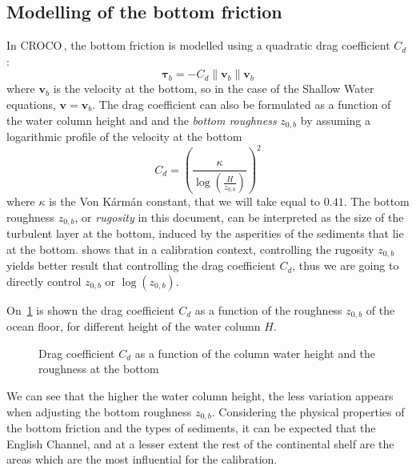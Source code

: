 \documentclass[../../Main_ManuscritThese.tex]{subfiles}
\newcommand{\CROCO}{CROCO\,}
\newcommand{\zob}{z_{0,b}}
\newcommand\imgpath{/home/victor/acadwriting/Manuscrit/Text/Chapter5/img/}
\begin{document}
\subsection{Modelling of the bottom friction}
\label{ssec:modelling_bottom}
In \CROCO, the bottom friction is modelled using a quadratic drag
coefficient $C_d$:
\begin{equation}
    \label{eq:bottom_stress_tau}
    \bm{\tau}_b= -C_d \|\mathbf{v}_b\|\mathbf{v}_b 
  \end{equation}
  where $\mathbf{v}_b$ is the velocity at the bottom, so in the case
  of the Shallow Water equations, $\mathbf{v} = \mathbf{v}_b$.  The
  drag coefficient can also be formulated as a function of the water
  column height and and the \emph{bottom roughness} $\zob$ by assuming a
  logarithmic profile of the velocity at the bottom~\cite{boutet_estimation_2015}
  \begin{equation}
    \label{eq:quadratic_friction_vonkarman}
  C_d = \left(\frac{\kappa}{\log\left(\frac{H}{\zob}\right)}\right)^2%
\end{equation}
where $\kappa$ is the Von K\'arm\'an constant, that we will take equal
to $0.41$.  The bottom roughness $\zob$, or \emph{rugosity} in this
document, can be interpreted as the size of the turbulent layer at the
bottom, induced by the asperities of the sediments that lie at the
bottom.
\cite{boutet_estimation_2015} shows that in a calibration context,
controlling the rugosity $\zob$ yields better result that controlling
the drag coefficient $C_d$, thus we are going to directly control $\zob$ or $\log(\zob)$.


On~\cref{fig:cd_zob} is shown the drag coefficient $C_d$ as a function
of the roughness $\zob$ of the ocean floor, for different height of
the water column $H$.
\begin{figure}[ht]
  \centering 
  \caption{\label{fig:cd_zob} Drag coefficient $C_d$ as a function of
    the column water height and the roughness at the bottom}
\end{figure}
We can see that the higher the water column height, the less variation
appears when adjusting the bottom roughness $\zob$.  Considering the
physical properties of the bottom friction and the types of sediments,
it can be expected that the English Channel, and at a lesser extent
the rest of the continental shelf are the areas which are the most
influential for the calibration.
\end{document}
